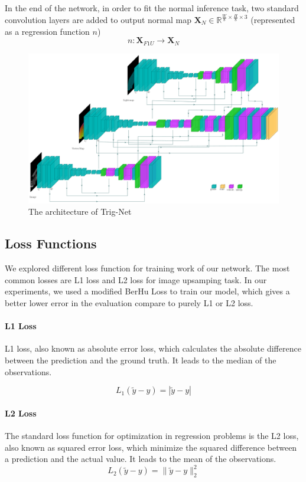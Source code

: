 In the end of the network, in order to fit the normal inference task, two standard convolution layers are added to output normal map $ \textbf{X}_{N} \in  \mathbb{R}^{\frac{W}{8}\times \frac{H}{8}\times 3} $ (represented as a regression function $ n $)
\[n:\textbf{X}_{F1U} \rightarrow  \textbf{X}_{N} \] 

\begin{figure}
	\centering
	\includegraphics[width=\textwidth]{Figures/trignet} %
	\decoRule
	\caption{The architecture of Trig-Net}
	\label{fig:Trig-Net}
\end{figure}




\subsection{Loss Functions}
We explored different loss function for training work of our network. The most common losses are L1 loss and L2 loss for image upsamping task. In our experiments, we used a modified BerHu Loss to train our model, which gives a better lower error in the evaluation compare to purely L1 or L2 loss. 
\paragraph{L1 Loss}
L1 loss, also known as absolute error loss, which calculates the absolute difference between the prediction and the ground truth. It leads to the median of the observations.

\[ L_1(\tilde y - y) = |\tilde y - y | \]

\paragraph{L2 Loss}
The standard loss function for optimization in regression problems is the L2 loss, also known as squared error loss, which minimize the squared difference between a prediction and the actual value. It leads to the mean of the observations. 
\[ L_2(\tilde y - y) = \|\tilde y - y \|_2^2 \]


